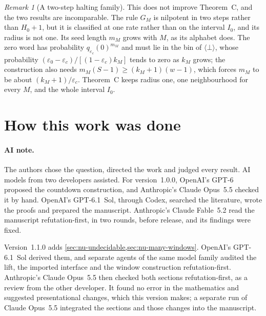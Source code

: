 \documentclass[11pt]{article}
\theoremstyle{plain}
\theoremstyle{definition}
\theoremstyle{remark}
\newtheorem{remark}[theorem]{Remark}
\newcommand{\eps}{\varepsilon}
\begin{document}
\begin{remark}[A two-step halting family]
This does not improve Theorem~C, and the two results are incomparable. The rule $G_M$ is nilpotent in two steps rather than $H_0+1$, but it is classified at one rate rather than on the interval $I_0$, and its radius is not one. Its seed length $m_M$ grows with $M$, as its alphabet does. The zero word has probability $q_{\eps_c}(0)^{m_M}$ and must lie in the bin of $\langle\bot\rangle$, whose probability $(\eps_0-\eps_c)/[(1-\eps_c)k_M]$ tends to zero as $k_M$ grows; the construction also needs $m_M(S-1)\geq(k_M+1)(w-1)$, which forces $m_M$ to be about $(k_M+1)/\eps_c$. Theorem~C keeps radius one, one neighbourhood for every $M$, and the whole interval $I_0$.
\end{remark}

\section{How this work was done}

\paragraph{AI note.}
The authors chose the question, directed the work and judged every result. AI models from two developers assisted. For version~1.0.0, OpenAI's GPT-6 proposed the countdown construction, and Anthropic's Claude Opus~5.5 checked it by hand. OpenAI's GPT-6.1~Sol, through Codex, searched the literature, wrote the proofs and prepared the manuscript. Anthropic's Claude Fable~5.2 read the manuscript refutation-first, in two rounds, before release, and its findings were fixed.

Version~1.1.0 adds \cref{sec:nu-undecidable,sec:nu-many-windows}. OpenAI's GPT-6.1~Sol derived them, and separate agents of the same model family audited the lift, the imported interface and the window construction refutation-first. Anthropic's Claude Opus~5.5 then checked both sections refutation-first, as a review from the other developer. It found no error in the mathematics and suggested presentational changes, which this version makes; a separate run of Claude Opus~5.5 integrated the sections and those changes into the manuscript.
\end{document}
